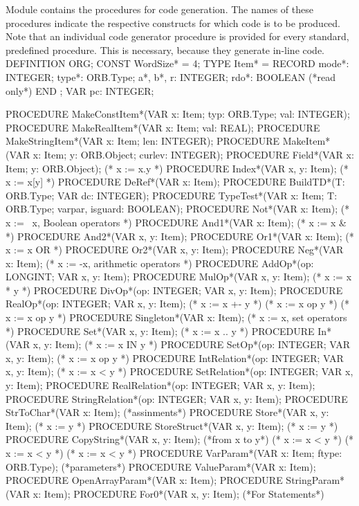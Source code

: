 \noindent Module  contains the procedures for code generation. The names of these procedures indicate the respective constructs for which code is to be produced. Note that an individual code generator procedure is provided for every standard, predefined procedure. This is necessary, because they generate in-line code.
\begintt
DEFINITION ORG;
  CONST WordSize* = 4;
  TYPE Item* = RECORD
    mode*: INTEGER;
    type*: ORB.Type;
    a*, b*, r: INTEGER;
    rdo*: BOOLEAN (*read only*)
  END ;
  VAR pc: INTEGER;
  
  PROCEDURE MakeConstItem*(VAR x: Item; typ: ORB.Type; val: INTEGER);
  PROCEDURE MakeRealItem*(VAR x: Item; val: REAL);
  PROCEDURE MakeStringItem*(VAR x: Item; len: INTEGER);
  PROCEDURE MakeItem*(VAR x: Item; y: ORB.Object; curlev: INTEGER);
  PROCEDURE Field*(VAR x: Item; y: ORB.Object); (* x := x.y *)
  PROCEDURE Index*(VAR x, y: Item); (* x := x[y] *)
  PROCEDURE DeRef*(VAR x: Item);
  PROCEDURE BuildTD*(T: ORB.Type; VAR dc: INTEGER);
  PROCEDURE TypeTest*(VAR x: Item; T: ORB.Type; varpar, isguard: BOOLEAN);
  PROCEDURE Not*(VAR x: Item); (* x := ~x, Boolean operators *)
  PROCEDURE And1*(VAR x: Item); (* x := x & *)
  PROCEDURE And2*(VAR x, y: Item);
  PROCEDURE Or1*(VAR x: Item); (* x := x OR *)
  PROCEDURE Or2*(VAR x, y: Item);
  PROCEDURE Neg*(VAR x: Item); (* x := -x, arithmetic operators *)
  PROCEDURE AddOp*(op: LONGINT; VAR x, y: Item);
  PROCEDURE MulOp*(VAR x, y: Item); (* x := x * y *)
  PROCEDURE DivOp*(op: INTEGER; VAR x, y: Item);
  PROCEDURE RealOp*(op: INTEGER; VAR x, y: Item);
  (* x := x +- y *)
  (* x := x op y *) (* x := x op y *)
  PROCEDURE Singleton*(VAR x: Item); (* x := {x}, set operators *)
  PROCEDURE Set*(VAR x, y: Item); (* x := {x .. y} *)
  PROCEDURE In*(VAR x, y: Item); (* x := x IN y *)
  PROCEDURE SetOp*(op: INTEGER; VAR x, y: Item); (* x := x op y *)
  PROCEDURE IntRelation*(op: INTEGER; VAR x, y: Item); (* x := x < y *)
  PROCEDURE SetRelation*(op: INTEGER; VAR x, y: Item);
  PROCEDURE RealRelation*(op: INTEGER; VAR x, y: Item);
  PROCEDURE StringRelation*(op: INTEGER; VAR x, y: Item);
  PROCEDURE StrToChar*(VAR x: Item); (*assinments*)
  PROCEDURE Store*(VAR x, y: Item); (* x := y *)
  PROCEDURE StoreStruct*(VAR x, y: Item); (* x := y *)
  PROCEDURE CopyString*(VAR x, y: Item); (*from x to y*)
  (* x := x < y *) (* x := x < y *)
  (* x := x < y *)
  PROCEDURE VarParam*(VAR x: Item; ftype: ORB.Type); (*parameters*)
  PROCEDURE ValueParam*(VAR x: Item);
  PROCEDURE OpenArrayParam*(VAR x: Item);
  PROCEDURE StringParam*(VAR x: Item);
  PROCEDURE For0*(VAR x, y: Item); (*For Statements*)
